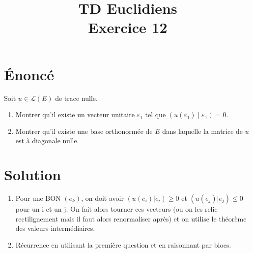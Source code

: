 \documentclass[french]{article}
\title{TD Euclidiens\\ Exercice 12}
\date{}
\begin{document}
\maketitle

\section{Énoncé}
Soit $u\in\mathcal{L}(E)$ de trace nulle.
\begin{enumerate}
	\item Montrer qu'il existe un vecteur unitaire $\varepsilon_1$ tel que $(u(\varepsilon_1)\mid\varepsilon_1)=0$.
	\item Montrer qu'il existe une base orthonormée de $E$ dans laquelle la matrice de $u$ est à diagonale nulle.
\end{enumerate}
\section{Solution}
\begin{enumerate}
	\item Pour une BON $(e_k)$, on doit avoir $(u(e_i)|e_i)\geqslant0$ et $(u(e_j)|e_j)\leqslant0$ pour un i et un j. On fait alors tourner ces vecteurs (ou on les relie rectilignement mais il faut alors renormaliser après) et on utilise le théorème des valeurs intermédiaires.
	\item Récurrence en utilisant la première question et en raisonnant par blocs.
\end{enumerate}
\end{document}

